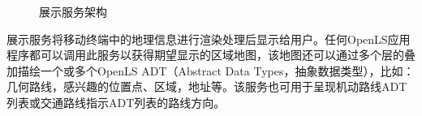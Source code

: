 \documentclass{article}
\begin{document}
\begin{CJK}{UTF8}{gbsn}
	\begin{figure}[htbp]
		\centering
		\hspace{10pt}
		\caption{展示服务架构}
	\end{figure}

	展示服务将移动终端中的地理信息进行渲染处理后显示给用户。任何OpenLS应用程序都可以调用此服务以获得期望显示的区域地图，该地图还可以通过多个层的叠加描绘一个或多个OpenLS ADT（Abstract Data Types，抽象数据类型），比如：几何路线，感兴趣的位置点、区域，地址等。该服务也可用于呈现机动路线ADT列表或交通路线指示ADT列表的路线方向。


\end{CJK}
\end{document}
